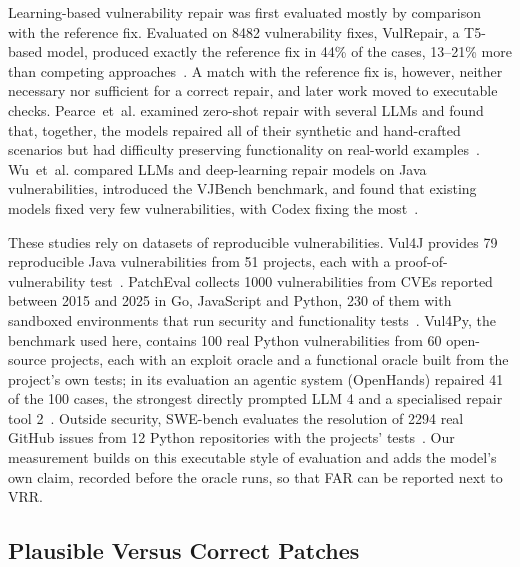\documentclass[ai,article,submit,oneauthor]{Definitions/mdpi}
\begin{document}
Learning-based vulnerability repair was first evaluated mostly by comparison with the reference fix. Evaluated on 8482 vulnerability fixes, VulRepair, a T5-based model, produced exactly the reference fix in 44\% of the cases, 13--21\% more than competing approaches~\cite{Fu2022VulrepairT5Based}. A match with the reference fix is, however, neither necessary nor sufficient for a correct repair, and later work moved to executable checks. Pearce~et~al. examined zero-shot repair with several LLMs and found that, together, the models repaired all of their synthetic and hand-crafted scenarios but had difficulty preserving functionality on real-world examples~\cite{Pearce2023ExaminingZeroShot}. Wu~et~al. compared LLMs and deep-learning repair models on Java vulnerabilities, introduced the VJBench benchmark, and found that existing models fixed very few vulnerabilities, with Codex fixing the most~\cite{Wu2023HowEffectiveAre}.

These studies rely on datasets of reproducible vulnerabilities. Vul4J provides 79 reproducible Java vulnerabilities from 51 projects, each with a proof-of-vulnerability test~\cite{Bui2022Vul4jDatasetOf}. PatchEval collects 1000 vulnerabilities from CVEs reported between 2015 and 2025 in Go, JavaScript and Python, 230 of them with sandboxed environments that run security and functionality tests~\cite{Wei2025PatchevalNewBenchmark}. Vul4Py, the benchmark used here, contains 100 real Python vulnerabilities from 60 open-source projects, each with an exploit oracle and a functional oracle built from the project's own tests; in its evaluation an agentic system (OpenHands) repaired 41 of the 100 cases, the strongest directly prompted LLM 4 and a specialised repair tool 2~\cite{Bui2026Vul4pyBenchmarkingAutomated}. Outside security, SWE-bench evaluates the resolution of 2294 real GitHub issues from 12 Python repositories with the projects' tests~\cite{Jimenez2024SwebenchCanLanguage}. Our measurement builds on this executable style of evaluation and adds the model's own claim, recorded before the oracle runs, so that FAR can be reported next to VRR.

\subsection{Plausible Versus Correct Patches}
\end{document}
